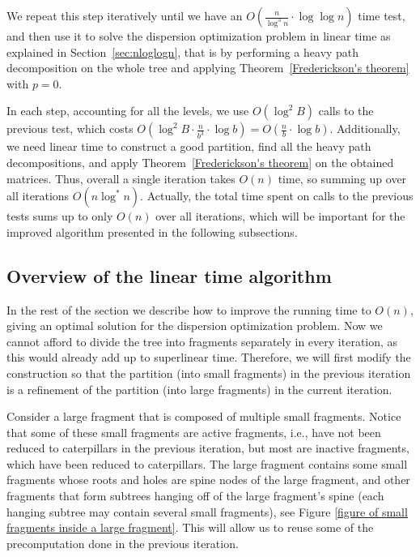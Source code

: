 \documentclass[11pt,a4paper]{article}
\theoremstyle{definition}
\theoremstyle{remark}
\begin{document}
We repeat this step iteratively until we have an $O(\frac{n}{\log ^3n} \cdot \log \log n)$ time test, and then use it to
solve the dispersion optimization problem in linear time as explained in Section~\ref{sec:nloglogn}, that is
by performing a heavy path decomposition on the whole tree and applying Theorem~\ref{Frederickson's theorem} with $p=0$.

In each step, accounting for all the levels, we use $O(\log^{2}B)$ calls to the previous test,
which costs $O(\log ^2B \cdot \frac{n}{b^3} \cdot \log b)=O(\frac{n}{b} \cdot \log b)$.
Additionally, we need linear time to construct a good partition, find all the heavy path decompositions,
and apply Theorem~\ref{Frederickson's theorem} on the obtained matrices. Thus, overall
a single iteration takes $O(n)$ time, so summing up over all iterations $O(n\log^{*}n)$.
Actually, the total time spent on calls to the previous tests sums up to only $O(n)$ over all iterations, which will
be important for the improved algorithm presented in the following subsections.

\subsection{Overview of the linear time algorithm}
In the rest of the section we describe how to improve the running time to $O(n)$, giving an optimal solution for the dispersion optimization problem.
Now we cannot afford to divide the tree into fragments separately in every iteration, as this would already add up to superlinear time.
Therefore, we will first modify the construction so that the partition (into small fragments) in the previous iteration is a refinement of the partition
(into large fragments) in the current iteration.

Consider a large fragment that is composed of multiple small fragments. Notice that some of these small fragments are active fragments, i.e., have not been reduced to caterpillars in the previous iteration, but most are inactive fragments, which have
been reduced to caterpillars. The large fragment contains some small fragments whose roots and holes are spine nodes of the large fragment,
and other fragments that form subtrees hanging off of the large fragment's spine (each hanging subtree may
contain several small fragments), see Figure \ref{figure of small fragments inside a large fragment}. This will allow us to
reuse some of the precomputation done in the previous iteration.
\end{document}
